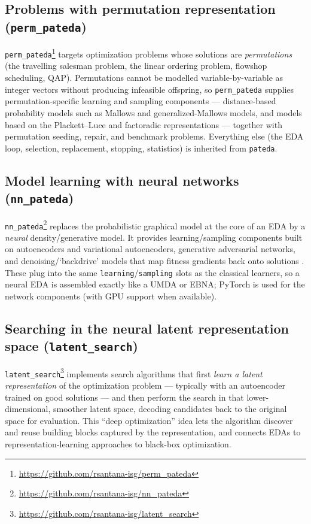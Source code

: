 \documentclass[a4paper,11pt]{article}
\begin{document}
\subsection{Problems with permutation representation (\texttt{perm\_pateda})}

\texttt{perm\_pateda}\footnote{\url{https://github.com/rsantana-isg/perm_pateda}}
targets optimization problems whose solutions are \emph{permutations} (the
travelling salesman problem, the linear ordering problem, flowshop scheduling,
QAP). Permutations cannot be modelled variable-by-variable as integer vectors
without producing infeasible offspring, so \texttt{perm\_pateda} supplies
permutation-specific learning and sampling components --- distance-based
probability models such as Mallows and generalized-Mallows models, and models
based on the Plackett--Luce and factoradic representations --- together with
permutation seeding, repair, and benchmark problems. Everything else (the EDA
loop, selection, replacement, stopping, statistics) is inherited from
\texttt{pateda}.

\subsection{Model learning with neural networks (\texttt{nn\_pateda})}

\texttt{nn\_pateda}\footnote{\url{https://github.com/rsantana-isg/nn_pateda}}
replaces the probabilistic graphical model at the core of an EDA by a
\emph{neural} density/generative model. It provides learning/sampling components
built on autoencoders and variational autoencoders, generative adversarial
networks, and denoising/`backdrive' models that map fitness gradients back onto
solutions \citep{Garciarena_et_al:2018a,Marti_et_al:2008}. These plug into the
same \texttt{learning}/\texttt{sampling} slots as the classical learners, so a
neural EDA is assembled exactly like a UMDA or EBNA; PyTorch is used for the
network components (with GPU support when available).

\subsection{Searching in the neural latent representation space (\texttt{latent\_search})}

\texttt{latent\_search}\footnote{\url{https://github.com/rsantana-isg/latent_search}}
implements search algorithms that first \emph{learn a latent representation} of
the optimization problem --- typically with an autoencoder trained on good
solutions --- and then perform the search in that lower-dimensional, smoother
latent space, decoding candidates back to the original space for evaluation. This
``deep optimization'' idea lets the algorithm discover and reuse building blocks
captured by the representation, and connects EDAs to representation-learning
approaches to black-box optimization.
\end{document}
